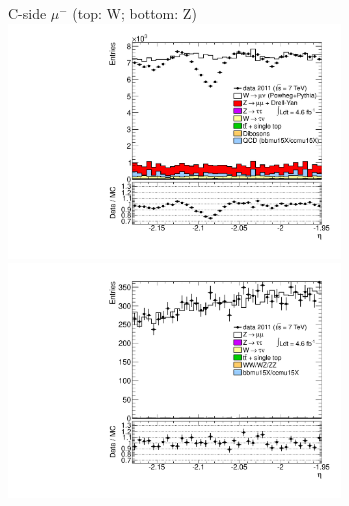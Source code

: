 {{\cole
}



 {
\colb[T]

C-side $\mu^{-}$ (top: W; bottom: Z)
\centering
\includegraphics[width=0.66\textwidth]{dates/20130306/figures/etaphi/W_10_C_stack_l_eta_NEG} \\
\includegraphics[width=0.66\textwidth]{dates/20130306/figures/etaphi/ZlObarrel_10_C_stack_lN_eta_ALL.pdf}

}}
